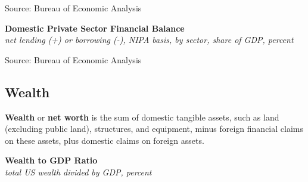 \documentclass{report}
\makeatletter
\newcommand{\tbllink}[1]{\href{https://raw.githubusercontent.com/bdecon/US-chartbook/master/chartbook/data/#1}{\faTable}}
\newcommand*\short[1]{\expandafter\@gobbletwo\number\numexpr#1\relax}
\newcommand{\sbar}[4]{
		\addplot[ybar stacked, bar width=2.3pt, draw opacity=0, fill=#1] 
			table [x=#2, y=#3, col sep=comma]{#4};}
\newcommand{\dateaxisticks}{
		date coordinates in=x, axis line style={draw=none},
		xmax={2023-11-01},
		max space between ticks=40,	    
		xtick={{1990-01-01}, {1992-01-01}, {1994-01-01}, 
			{1996-01-01}, {1998-01-01}, {2000-01-01}, 
			{2002-01-01}, {2004-01-01}, {2006-01-01},
			{2008-01-01}, {2010-01-01}, {2012-01-01}, {2014-01-01},
		    {2016-01-01}, {2018-01-01}, {2020-01-01}, {2022-01-01}, 
		    {2024-01-01}, {2026-01-01}},
		minor xtick={{1989-01-01}, {1991-01-01}, {1993-01-01},
			{1995-01-01}, {1997-01-01}, {1999-01-01}, 
			{2001-01-01}, {2003-01-01}, {2005-01-01}, {2007-01-01},
		    {2009-01-01}, {2011-01-01}, {2013-01-01}, {2015-01-01},
		    {2017-01-01}, {2019-01-01}, {2021-01-01}, {2023-01-01}, 
		    {2025-01-01}, {2027-01-01}},
		enlarge y limits={0.06}, enlarge x limits={0.01},
		}
\newcommand{\bbar}[2]{extra #1 ticks = {{#2}}, extra #1 tick labels = ,
		extra #1 tick style = {grid=major, grid style={thick, black!25}},}
\newcommand{\rbars}{
		\fill[color=black!10] (axis cs:{1990-07-01},\pgfkeysvalueof{/pgfplots/ymin}) rectangle 
			(axis cs:{1991-03-01}, \pgfkeysvalueof{/pgfplots/ymax});
		\fill[color=black!10] (axis cs:{2007-12-01},\pgfkeysvalueof{/pgfplots/ymin}) rectangle 
			(axis cs:{2009-07-01}, \pgfkeysvalueof{/pgfplots/ymax});
		\fill[color=black!10] (axis cs:{2001-03-01},\pgfkeysvalueof{/pgfplots/ymin}) rectangle 
			(axis cs:{2001-11-01}, \pgfkeysvalueof{/pgfplots/ymax});
		\fill[color=black!10] (axis cs:{2020-02-01},\pgfkeysvalueof{/pgfplots/ymin}) rectangle 
			(axis cs:{2020-05-01}, \pgfkeysvalueof{/pgfplots/ymax});}
\makeatother
\begin{document}
{\begin{minipage}{0.76\textwidth}
\footnotesize{Source: Bureau of Economic Analysis} \hfill \tbllink{sectbal.csv} 
\vspace{3mm}

\small  


\vspace{1mm}

\normalsize \textbf{Domestic Private Sector Financial Balance}\\
\footnotesize{\textit{net lending (+) or borrowing (-), NIPA basis, by sector, share of GDP, percent}}
\vspace{2.6cm}

\hspace{4mm} 

\footnotesize{Source: Bureau of Economic Analysis} \hfill \tbllink{sectbal2.csv}
\end{minipage}
\newpage
\vspace*{-10mm}

\begin{minipage}{0.76\textwidth}
\subsection*{Wealth} 
\hypertarget{ofw}{\label{ofw}}
\small \textbf{Wealth} or \textbf{net worth} is the sum of domestic tangible assets, such as land (excluding public land), structures, and equipment, minus foreign financial claims on these assets, plus domestic claims on foreign assets.   


\vspace{1mm}

\normalsize \textbf{Wealth to GDP Ratio}\\
\footnotesize{\textit{total US wealth divided by GDP, percent}}
\vspace{3.0cm}


\end{minipage}}
\end{document}
